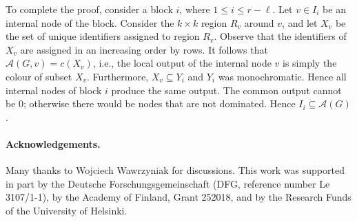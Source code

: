 \documentclass[11pt,a4paper]{article}
\theoremstyle{definition}
\newcommand{\A}{\mathcal{A}}
\begin{document}
To complete the proof, consider a block $i$, where $1 \le i \le r-\ell$. Let $v \in I_i$ be an internal node of the block. Consider the $k \times k$ region $R_v$ around $v$, and let $X_v$ be the set of unique identifiers assigned to region $R_v$. Observe that the identifiers of $X_v$ are assigned in an increasing order by rows. It follows that $\A(G,v) = c(X_v)$, i.e., the local output of the internal node $v$ is simply the colour of subset $X_v$. Furthermore, $X_v \subseteq Y_i$ and $Y_i$ was monochromatic. Hence all internal nodes of block $i$ produce the same output. The common output cannot be $0$; otherwise there would be nodes that are not dominated. Hence $I_i \subseteq \A(G)$.


\paragraph{Acknowledgements.}

Many thanks to Wojciech Wawrzyniak for discussions. This work was supported in part by the Deutsche Forschungsgemeinschaft (DFG, reference number Le 3107/1-1), by the Academy of Finland, Grant 252018, and by the Research Funds of the University of Helsinki.


\def\UrlFont{\sf\footnotesize}
\setlength{\bibsep}{3pt}


\end{document}
